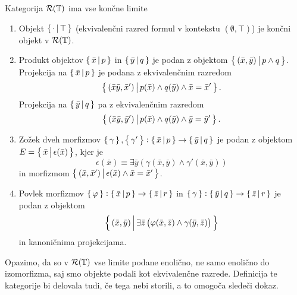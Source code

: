 \documentclass[../kategoricna_logika.tex]{subfiles}
\begin{document}
  \begin{lema}\label{lema:limite-v-sintaktični-kategoriji}
    Kategorija $\mathcal{R}(\mathbb{T})$ ima vse končne limite
    \begin{enumerate}[label=(\roman*)]
    \item Objekt $\left\lbrace\,\cdot \,\middle|\, \top\,\right\rbrace$ (ekvivalenčni razred
      formul v kontekstu $(\emptyset, \top)$) je končni objekt v
      $\mathcal{R}(\mathbb{T})$.
    \item Produkt objektov $\left\lbrace\,\bar{x}\,\middle|\, p\,\right\rbrace$ in
      $\left\lbrace\,\bar{y}\,\middle|\, q\,\right\rbrace$ je podan z objektom
      $\left\lbrace\,(\bar{x},\bar{y})\,\middle|\, p \wedge q\,\right\rbrace$.  Projekcija na
      $\left\lbrace\,\bar{x}\,\middle|\, p\,\right\rbrace$ je podana z ekvivalenčnim razredom
      $$\left\lbrace\,(\bar{x}\bar{y},\bar{x}')\,\middle|\, p(\bar{x}) \wedge q(\bar{y}) \wedge \bar{x} = \bar{x}'\,\right\rbrace.$$
      Projekcija na $\left\lbrace\,\bar{y}\,\middle|\, q\,\right\rbrace$ pa z ekvivalenčnim
      razredom
      $$\left\lbrace\,(\bar{x}\bar{y},\bar{y}')\,\middle|\, p(\bar{x}) \wedge q(\bar{y}) \wedge \bar{y} = \bar{y}'\,\right\rbrace.$$
    \item Zožek dveh morfizmov
      $\left\lbrace\,\gamma\,\right\rbrace, \left\lbrace\,\gamma'\,\right\rbrace : \left\lbrace\,\bar{x}\,\middle|\, p\,\right\rbrace \to
      \left\lbrace\,\bar{y}\,\middle|\, q\,\right\rbrace$ je podan z objektom
      $E = \left\lbrace\,\bar{x}\,\middle|\, \epsilon(\bar{x})\,\right\rbrace$, kjer je
      $$\epsilon(\bar{x}) \equiv \exists \bar{y}\left(\gamma(\bar{x},\bar{y}) \wedge \gamma'(\bar{x},\bar{y})\right)$$
      in morfizmom
      $\left\lbrace\,(\bar{x},\bar{x}')\,\middle|\, \epsilon(\bar{x}) \wedge
        \bar{x} = \bar{x}'\,\right\rbrace$.
    \item Povlek morfizmov
      $\left\lbrace\,\varphi\,\right\rbrace : \left\lbrace\,\bar{x}\,\middle|\, p\,\right\rbrace \to
      \left\lbrace\,\bar{z}\,\middle|\, r\,\right\rbrace$ in
      $\left\lbrace\,\gamma\,\right\rbrace : \left\lbrace\,\bar{y}\,\middle|\, q\,\right\rbrace \to
      \left\lbrace\,\bar{z}\,\middle|\, r\,\right\rbrace$ je podan z objektom
      $$\left\lbrace\,(\bar{x},\bar{y})\,\middle|\, \exists \bar{z} \left(\varphi(\bar{x},\bar{z}) \wedge \gamma(\bar{y},\bar{z})\right)\,\right\rbrace$$
      in kanoničnima projekcijama.
    \end{enumerate}
  \end{lema}
  \begin{opomba}
    Opazimo, da so v $\mathcal{R}(\mathbb{T})$ vse limite podane enolično, ne
    samo enolično do izomorfizma, saj smo objekte podali kot
    ekvivalenčne razrede. Definicija te kategorije bi delovala tudi,
    če tega nebi storili, a to omogoča sledeči dokaz.
  \end{opomba}
\end{document}
